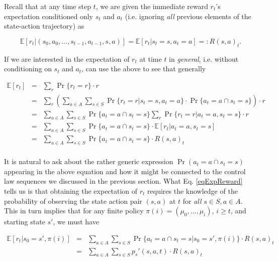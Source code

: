 \documentclass[11pt]{article} %
\begin{document}
Recall that at any time step $t$, we are given the immediate reward $r_t$'s expectation conditioned only $s_t$ and $a_t$ (i.e. ignoring \textit{all} previous elements of the state-action trajectory) as

\begin{equation}
	\mathbb{E}[r_t | (s_0,a_0,\dots,s_{t-1},a_{t-1},s,a)] = \mathbb{E}[r_t | s_t = s, a_t = a] =: R(s,a)_t.
\end{equation}

If we are interested in the expectation of $r_t$ at time $t$ in \textit{general}, i.e. without conditioning on $s_t$ and $a_t$, can use the above to see that generally

\begin{equation}\label{eqExpReward}
	\begin{array}{rcl}
		\mathbb{E}[r_t]	& = &	\sum_r \Pr\{r_t = r\} \cdot r \\
					& = & 	\sum_r \left(\sum_{a \in A} \sum_{s \in S} \Pr\{r_t = r | s_t = s, a_t = a\} \cdot \Pr\{ a_t = a \cap s_t = s \} \right) \cdot r \\
					& = &	\sum_{a \in A} \sum_{s \in S} \Pr \{a_t = a \cap s_t = s\} \sum_r \Pr \{r_t = r | a_t = a, s_t = s\} \cdot r \\
					& = &	\sum_{a \in A} \sum_{s \in S} \Pr \{a_t = a \cap s_t = s\} \cdot \mathbb{E}[r_t | a_t = a, s_t = s] \\
					& = &	\sum_{a \in A} \sum_{s \in S} \Pr \{a_t = a \cap s_t = s\} \cdot R(s,a)_t \\
	\end{array}
\end{equation}

It is natural to ask about the rather generic expression $\Pr(a_t = a \cap s_t = s)$ appearing in the above equation and how it might be connected to the control law sequences we discussed in the previous section. What Eq. \ref{eqExpReward} tells us is that obtaining the expectation of $r_t$ requires the knowledge of the probability of observing the state action pair $(s,a)$ at $t$ for \textit{all} $s \in S, a \in A$. This in turn implies that for any finite policy $\pi(i) = (\mu_0,\dots,\mu_i)$, $i \ge t$, and starting state $s'$, we must have 

\begin{equation}\label{eqExpReward}
	\begin{array}{rcl}
		\mathbb{E}[r_t | s_0 = s', \pi(i)]	& = &	\sum_{a \in A} \sum_{s \in S} \Pr \{a_t = a \cap s_t = s | s_0 = s', \pi(i)\} \cdot R(s,a)_t \\
								& = &	\sum_{a \in A} \sum_{s \in S} p_s'(s,a,t) \cdot R(s,a)_t \\
	\end{array}
\end{equation}
\end{document}
